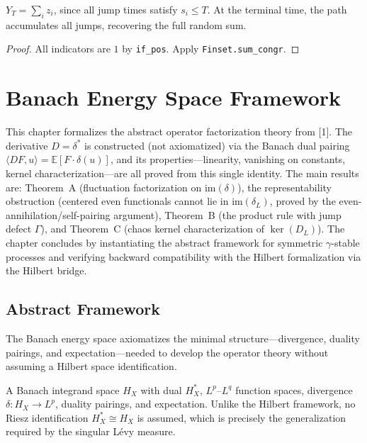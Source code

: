 \begin{theorem}\label{thm:path_terminal}
\leanok
{}
$Y_T = \sum_i z_i$, since all jump times satisfy $s_i \leq T$.
At the terminal time, the path accumulates all jumps, recovering the full random sum.
\end{theorem}
\begin{proof}\leanok All indicators are $1$ by \texttt{if\_pos}. Apply \texttt{Finset.sum\_congr}.\end{proof}


\chapter{Banach Energy Space Framework}

This chapter formalizes the abstract operator factorization theory from [1].
The derivative $D = \delta^*$ is constructed (not axiomatized) via the Banach
dual pairing $\langle DF, u \rangle = \mathbb{E}[F \cdot \delta(u)]$, and
its properties---linearity, vanishing on constants, kernel characterization---are
all proved from this single identity. The main results are:
Theorem~A (fluctuation factorization on $\mathrm{im}(\delta)$),
the representability obstruction (centered even functionals cannot lie in
$\mathrm{im}(\delta_L)$, proved by the even-annihilation/self-pairing argument),
Theorem~B (the product rule with jump defect $\Gamma$), and
Theorem~C (chaos kernel characterization of $\ker(D_L)$).
The chapter concludes by instantiating the abstract framework for symmetric
$\gamma$-stable processes and verifying backward compatibility with the
Hilbert formalization via the Hilbert bridge.

\section{Abstract Framework}

The Banach energy space axiomatizes the minimal structure---divergence, duality pairings, and expectation---needed to develop the operator theory without assuming a Hilbert space identification.

\begin{defn}\label{def:banach_space}
\leanok
A Banach integrand space $H_X$ with dual $H_X^*$, $L^p$--$L^q$ function spaces,
divergence $\delta : H_X \to L^p$, duality pairings, and expectation.
Unlike the Hilbert framework, no Riesz identification $H_X^* \cong H_X$ is assumed,
which is precisely the generalization required by the singular Lévy measure.
\end{defn}


